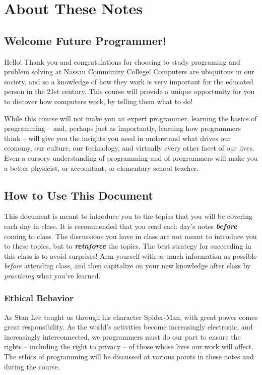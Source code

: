 
\chapter{About These Notes}

\section*{Welcome Future Programmer!}

Hello!  Thank you and congratulations for choosing to study programing and problem solving at Nassau Community College!  Computers are ubiquitous in our society, and so a knowledge of how they work is very important for the educated person in the 21st century.  This course will provide a unique opportunity for you to discover how computers work, by telling them what to do!

While this course will not make you an expert programmer, learning the basics of programming -- and, perhaps just as importantly, learning how programmers think -- will give you the insights you need in understand what drives our economy, our culture, our technology, and virtually every other facet of our lives.  Even a cursory understanding of programming and of programmers will make you a better physicist, or accountant, or elementary school teacher.

\section*{How to Use This Document}

This document is meant to introduce you to the topics that you will be covering each day in class.  It is recommended that you read each day's notes \textbf{\textit{before}} coming to class.  The discussions you have in class are not meant to introduce you to these topics, but to \textbf{\textit{reinforce}} the topics.  The best strategy for succeeding in this class is to avoid surprises!  Arm yourself with as much information as possible \textit{before} attending class, and then capitalize on your new knowledge after class by \textit{practicing} what you've learned.

\subsection*{Ethical Behavior}

As Stan Lee taught us through his character Spider-Man, with great power comes great responsibility.  As the world's activities become increasingly electronic, and increasingly interconnected, we programmers must do our part to ensure the rights -- including the right to privacy -- of those whose lives our work will affect.  The ethics of programming will be discussed at various points in these notes and during the course.

